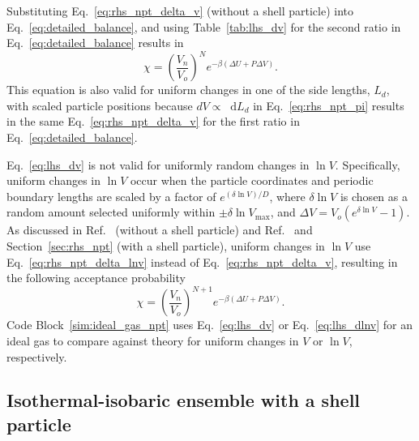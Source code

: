 \documentclass[
  9pt,
  bestpractices,
]{livecoms}
\newcommand*\diff{\mathop{}\!\mathrm{d}}
\begin{document}
Substituting Eq.~\ref{eq:rhs_npt_delta_v} (without a shell particle) into Eq.~\ref{eq:detailed_balance}, and using Table~\ref{tab:lhs_dv} for the second ratio in Eq.~\ref{eq:detailed_balance} results in
\begin{equation}
\chi=\left(\frac{V_n}{V_o}\right)^{N}e^{-\beta(\Delta U + P\Delta V)}.
\label{eq:lhs_dv}
\end{equation}
This equation is also valid for uniform changes in one of the side lengths, $L_d$, with scaled particle positions because $dV \propto \diff L_d$ in Eq.~\ref{eq:rhs_npt_pi} results in the same Eq.~\ref{eq:rhs_npt_delta_v} for the first ratio in Eq.~\ref{eq:detailed_balance}.

Eq.~\ref{eq:lhs_dv} is not valid for uniformly random changes in $\ln V$.
Specifically, uniform changes in $\ln V$ occur when the particle coordinates and periodic boundary lengths are scaled by a factor of $e^{(\delta\ln V)/D}$, where $\delta\ln V$ is chosen as a random amount selected uniformly within $\pm\delta\ln V_{\mathrm{max}}$, and $\Delta V = V_o(e^{\delta\ln V}-1)$.
As discussed in Ref.~\cite{frenkel_understanding_2002} (without a shell particle) and Ref.~\cite{corti_monte_2002} and Section~\ref{sec:rhs_npt} (with a shell particle), uniform changes in $\ln V$ use Eq.~\ref{eq:rhs_npt_delta_lnv} instead of Eq.~\ref{eq:rhs_npt_delta_v}, resulting in the following acceptance probability
\begin{equation}
\chi=\left(\frac{V_n}{V_o}\right)^{N+1}e^{-\beta(\Delta U + P\Delta V)}.
\label{eq:lhs_dlnv}
\end{equation}
Code Block~\ref{sim:ideal_gas_npt} uses Eq.~\ref{eq:lhs_dv} or Eq.~\ref{eq:lhs_dlnv} for an ideal gas to compare against theory for uniform changes in $V$ or $\ln V$, respectively.

\begin{figure}

\end{figure}

\subsection{\label{sec:rhs_npt_no_shell}Isothermal-isobaric ensemble with a shell particle}
\end{document}
